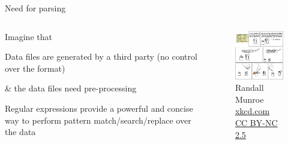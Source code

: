 \documentclass[xcolor=table,10pt,handout]{beamer}
\begin{document}
\begin{frame}{Need for parsing}
  \begin{columns}[T]
    \begin{column}{.4\textwidth}
      Imagine that
      \vspace{0.5cm}
      \begin{arrowlist}
        \itemsep8pt
        \item[]<1-> Data files are generated by a third party (no control
          over the format)
        \item[]<2-> \& the data files need pre-processing
          \vspace{0.3cm}
        \item<3-> Regular expressions provide a powerful and concise way
          to perform pattern match/search/replace over the data
      \end{arrowlist}

    \end{column}
    \begin{column}{.6\textwidth}
      \begin{figure}
        \includegraphics[width=6.4cm]{xkcd208.png}
        \caption*{\tiny  \textcopyright Randall Munroe \href{http://xkcd.com/208/}{xkcd.com} \href{http://creativecommons.org/licenses/by-nc/2.5/}{CC BY-NC 2.5}}
      \end{figure}
    \end{column}    

  \end{columns}
\end{frame}
\end{document}
